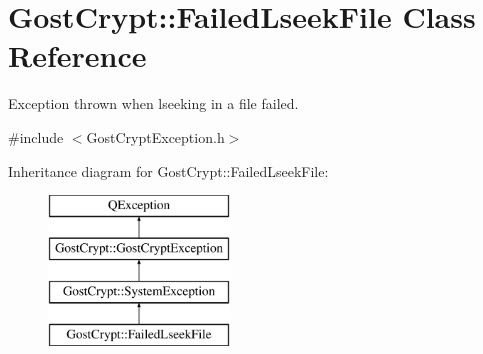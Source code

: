 \hypertarget{class_gost_crypt_1_1_failed_lseek_file}{}\section{Gost\+Crypt\+:\+:Failed\+Lseek\+File Class Reference}
\label{class_gost_crypt_1_1_failed_lseek_file}


Exception thrown when lseeking in a file failed.  




{\ttfamily \#include $<$Gost\+Crypt\+Exception.\+h$>$}

Inheritance diagram for Gost\+Crypt\+:\+:Failed\+Lseek\+File\+:\begin{figure}[H]
\begin{center}
\leavevmode
\includegraphics[height=4.000000cm]{class_gost_crypt_1_1_failed_lseek_file}
\end{center}
\end{figure}
